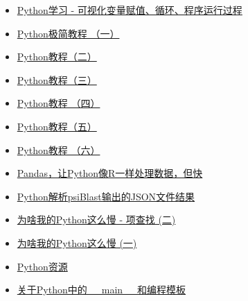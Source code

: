 \documentclass[]{article}
\providecommand{\tightlist}{%
  \setlength{\itemsep}{0pt}\setlength{\parskip}{0pt}}
\numberwithin{figure}{section}
\numberwithin{table}{section}
\begin{document}
\begin{itemize}
\tightlist
\item
  \href{https://mp.weixin.qq.com/s/zhr251PCTDGBO1YxYB-P6Q}{Python学习 - 可视化变量赋值、循环、程序运行过程}
\item
  \href{http://mp.weixin.qq.com/s?__biz=MzI5MTcwNjA4NQ==\&mid=2247483866\&idx=1\&sn=310341a1c8d348958c304df03dfd06a0\&chksm=ec0dc450db7a4d46e369637cd2867b0e56389bf4f2e1d0dce409bba38882e61e5063308a13af\#rd}{Python极简教程 （一）}
\item
  \href{http://mp.weixin.qq.com/s?__biz=MzI5MTcwNjA4NQ==\&mid=2247483866\&idx=2\&sn=bf3c07ee1b2936c7ea06b5d4ca820545\&chksm=ec0dc450db7a4d469f4f625babfb595b068137ea2b25a7682f9fb58ff771db6543f43def7950\#rd}{Python教程（二）}
\item
  \href{http://mp.weixin.qq.com/s?__biz=MzI5MTcwNjA4NQ==\&mid=2247483866\&idx=3\&sn=dec66c5f3f12919ce1b0bfbb545e3935\&chksm=ec0dc450db7a4d46e91b65446d6a192056ab6ff27c019fe3770cc32816b0ae3f16659ebba0a5\#rd}{Python教程（三）}
\item
  \href{http://mp.weixin.qq.com/s?__biz=MzI5MTcwNjA4NQ==\&mid=2247483866\&idx=4\&sn=3a0b0c5c0f736ddeadc4524bae8b2a91\&chksm=ec0dc450db7a4d465602b74e0fa968519a3a085a1901b5cca97ff886163422a24089378ff8f0\#rd}{Python教程 （四）}
\item
  \href{http://mp.weixin.qq.com/s?__biz=MzI5MTcwNjA4NQ==\&mid=2247483866\&idx=5\&sn=fd3526e11c4adf8194e1f92cd6d1749c\&chksm=ec0dc450db7a4d468c7d114352153eecbaedd7d37065f681caa28b74258a92038d1d2030056b\#rd}{Python教程（五）}
\item
  \href{http://mp.weixin.qq.com/s?__biz=MzI5MTcwNjA4NQ==\&mid=2247483866\&idx=6\&sn=ef7a0972abc002cfeba27815020e83aa\&chksm=ec0dc450db7a4d46f61328946fe257a1516785fb9a1f7c1663e86e4255ae6b616e3c07ac1cb0\#rd}{Python教程 （六）}
\item
  \href{http://mp.weixin.qq.com/s?__biz=MzI5MTcwNjA4NQ==\&mid=2247483865\&idx=1\&sn=a2e1474bbebce343ff4262e38653f4c4\&chksm=ec0dc453db7a4d45349076b1627eff5e292abceada59e832a46553f4ca614d62df96e097f871\#rd}{Pandas，让Python像R一样处理数据，但快}
\item
  \href{http://mp.weixin.qq.com/s/BN6u2aJkoMzffPv7rvbm8g}{Python解析psiBlast输出的JSON文件结果}
\item
  \href{http://mp.weixin.qq.com/s/-0UTgmdRQbF7I4fib62ooA}{为啥我的Python这么慢 - 项查找 (二)}
\item
  \href{https://mp.weixin.qq.com/s/n5kkZfC8FGlzeBODarLHcw}{为啥我的Python这么慢 (一)}
\item
  \href{http://mp.weixin.qq.com/s/1JlAROpOCBwaG574EwvkVw}{Python资源}
\item
  \href{http://mp.weixin.qq.com/s/JHDvdqq3Z-7uDmsyroblNQ}{关于Python中的\_\_main\_\_和编程模板}
\end{itemize}
\end{document}
